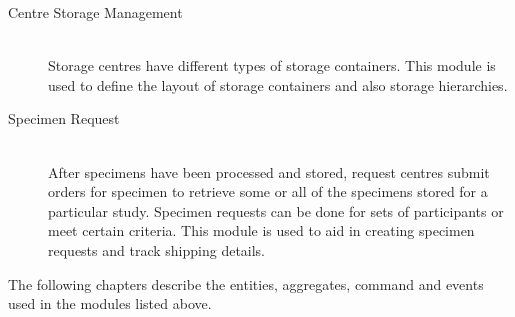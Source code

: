 \begin{description}
\item[Centre Storage Management] \hfill \\ Storage centres have different
  types of storage containers. This module is used to define the layout of
  storage containers and also storage hierarchies.

\item[Specimen Request] \hfill \\ After specimens have been processed and
  stored, request centres submit orders for specimen to retrieve some or all of
  the specimens stored for a particular study. Specimen requests can be done
  for sets of participants or meet certain criteria. This module is used to aid
  in creating specimen requests and track shipping details.

\end{description}

The following chapters describe the entities, aggregates, command and events
used in the  modules listed above.


